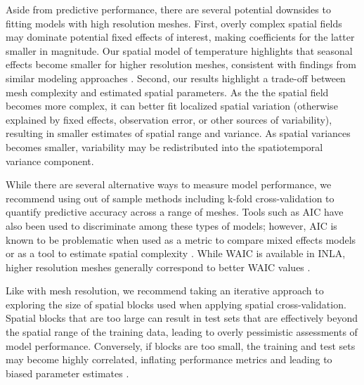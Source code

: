 \documentclass[11pt]{article}
\begin{document}
Aside from predictive performance, there are several potential downsides to
fitting models with high resolution meshes. First, overly complex spatial
fields may dominate potential fixed effects of interest, making coefficients
for the latter smaller in magnitude. Our spatial model of temperature
highlights that seasonal effects become smaller for higher resolution meshes,
consistent with findings from similar modeling approaches \citep{dambly2023}.
Second, our results highlight a trade-off between mesh complexity and estimated
spatial parameters. As the the spatial field becomes more complex, it can
better fit localized spatial variation (otherwise explained by fixed effects,
observation error, or other sources of variability), resulting in smaller
estimates of spatial range and variance. As spatial variances becomes smaller,
variability may be redistributed into the spatiotemporal variance component.

While there are several alternative ways to measure model performance, we
recommend using out of sample methods including k-fold cross-validation to
quantify predictive accuracy across a range of meshes. Tools such as AIC
\citep{akaike1973information} have also been used to discriminate among these
types of models; however, AIC is known to be problematic when used as a metric
to compare mixed effects models \citep{harrison_brief_2018} or as a tool to
estimate spatial complexity \citep{velasco_2019}. While WAIC is available in
INLA, higher resolution meshes generally correspond to better WAIC values
\citep{roste_2020}.

Like with mesh resolution, we recommend taking an iterative approach to
exploring the size of spatial blocks used when applying spatial
cross-validation. Spatial blocks that are too large can result in test sets
that are effectively beyond the spatial range of the training data, leading to
overly pessimistic assessments of model performance. Conversely, if blocks are
too small, the training and test sets may become highly correlated, inflating
performance metrics and leading to biased parameter estimates
\citep{valavi2018}.
\end{document}
